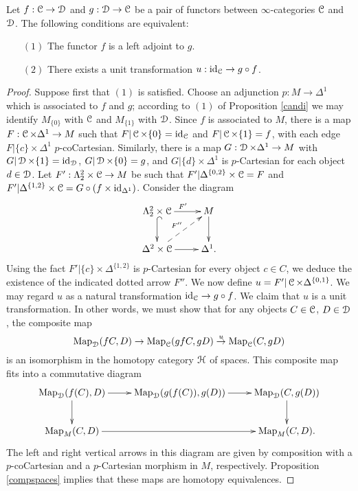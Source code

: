 \begin{proposition}\label{storut}
Let $f: \operatorname{\mathcal{C}} \rightarrow \operatorname{\mathcal{D}}$ and $g: \operatorname{\mathcal{D}} \rightarrow \operatorname{\mathcal{C}}$ be a pair of functors between $\infty$-categories $\operatorname{\mathcal{C}}$ and $\operatorname{\mathcal{D}}$. The following conditions are equivalent:
\begin{itemize}
\item[$(1)$] The functor $f$ is a left adjoint to $g$.
\item[$(2)$] There exists a unit transformation $u: \operatorname{id}_{\operatorname{\mathcal{C}}} \rightarrow g \circ f$.
\end{itemize}
\end{proposition}

\begin{proof}
Suppose first that $(1)$ is satisfied.
Choose an adjunction $p: M \rightarrow \Delta^1$ which is associated to $f$ and $g$; according to $(1)$ of Proposition \ref{candi} we may identify $M_{ \{0\} }$ with $\operatorname{\mathcal{C}}$ and $M_{ \{1\} }$ with $\operatorname{\mathcal{D}}$. Since $f$ is associated to $M$, there is a map $F: \operatorname{\mathcal{C}} \times \Delta^1 \rightarrow M$
such that $F | \operatorname{\mathcal{C}} \times \{0\} = \operatorname{id}_{\operatorname{\mathcal{C}}}$ and $F| \operatorname{\mathcal{C}} \times \{1\} = f$, with each edge
$F| \{c\} \times \Delta^1$ $p$-coCartesian. Similarly, there is a map $G: \operatorname{\mathcal{D}} \times \Delta^1 \rightarrow M$ with $G | \operatorname{\mathcal{D}} \times \{1\} = \operatorname{id}_{\operatorname{\mathcal{D}}}$, $G| \operatorname{\mathcal{D}} \times \{0\} = g$, and 
$G| \{d\} \times \Delta^1$ is $p$-Cartesian for each object $d \in \operatorname{\mathcal{D}}$. Let 
$F' : \Lambda^2_2 \times \operatorname{\mathcal{C}} \rightarrow M$ be such that $F' | \Delta^{ \{0,2\} } \times \operatorname{\mathcal{C}} = F$ and $F' | \Delta^{ \{1,2\} } \times \operatorname{\mathcal{C}} = G \circ ( f \times \operatorname{id}_{\Delta^1} )$. Consider the diagram
$$ \xymatrix{ \Lambda^2_2 \times \calC \ar@{^{(}->}[d] \ar[r]^{F'} & M \ar[d] \\
\Delta^2 \times \calC \ar[r] \ar@{-->}[ur]^{F''} & \Delta^1. }$$ Using the fact $F' | \{c\} \times \Delta^{ \{1,2\} }$ is $p$-Cartesian for every object $c \in C$, we deduce the existence of the indicated dotted arrow $F''$. We now define $u = F' | \operatorname{\mathcal{C}} \times \Delta^{ \{0,1\} }$. We may regard $u$ as a natural transformation $\operatorname{id}_{\operatorname{\mathcal{C}}} \rightarrow g \circ f$. We claim that $u$ is a unit transformation.
 In other words, we must show that for any objects $C \in \operatorname{\mathcal{C}}$, $D \in \operatorname{\mathcal{D}}$, the composite map
$$ \operatorname{{Map}}_{\operatorname{\mathcal{D}}}(fC, D) \rightarrow \operatorname{{Map}}_{\operatorname{\mathcal{C}}}(gfC, gD)
\stackrel{u}{\rightarrow} \operatorname{{Map}}_{\operatorname{\mathcal{C}}}(C,gD)$$
is an isomorphism in the homotopy category $\operatorname{\mathcal{H}}$ of spaces. This composite map
fits into a commutative diagram
$$ \xymatrix{ \bHom_{\calD}( f(C), D) \ar[r] \ar[d] &  \bHom_{\calD}(g(f(C)), g(D)) \ar[r] &
\bHom_{\calD}(C,g(D)) \ar[d] \\
\bHom_{M}(C,D) \ar[rr] & & \bHom_{M}(C,D). }$$
The left and right vertical arrows in this diagram are given by composition with
a $p$-coCartesian and a $p$-Cartesian morphism in $M$, respectively. Proposition \ref{compspaces} implies that these maps are homotopy equivalences.


\end{proof}
